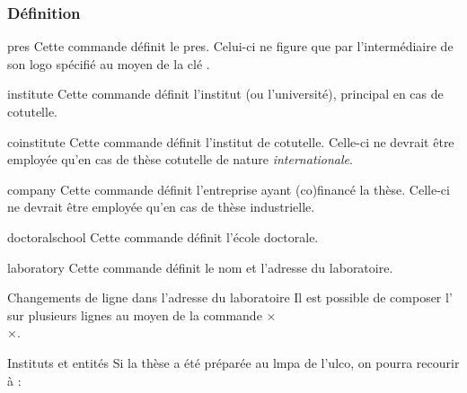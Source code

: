 \subsubsection{Définition}
%
\begin{docCommand}{pres}{}
  Cette commande définit le \gls{pres}. Celui-ci ne figure que
  par l'intermédiaire de son logo spécifié au moyen de la clé .
\end{docCommand}
%
\begin{docCommand}[doc description=\mandatory]{institute}{}
  Cette commande définit l'institut (ou l'université), principal
  en cas de cotutelle.
\end{docCommand}
%
\begin{docCommand}{coinstitute}{}
  Cette commande définit l'institut de cotutelle. Celle-ci ne
  devrait être employée qu'en cas de thèse cotutelle de nature
  \emph{internationale}.
\end{docCommand}
%
\begin{docCommand}{company}{}
  Cette commande définit l'entreprise ayant (co)financé la thèse.
  Celle-ci ne devrait être employée qu'en cas de thèse industrielle.
\end{docCommand}
%
\begin{docCommand}[doc description=\mandatory]{doctoralschool}{}
  Cette commande définit l'école doctorale.
\end{docCommand}
%
\begin{docCommand}[doc description=\mandatory]{laboratory}{}
  Cette commande définit le nom et l'adresse du laboratoire.
\end{docCommand}
%
\begin{dbremark}{Changements de ligne dans l'adresse du laboratoire}{}
  Il est possible de composer l' sur plusieurs
  lignes au moyen de la commande ×\\×.
\end{dbremark}
%
\begin{dbexample}{Instituts et entités}{}
  Si la thèse a été préparée au \gls{lmpa} de l'\gls{ulco}, on
  pourra recourir à :
  \NoAutoSpacing%
\begin{bodycode}
\end{bodycode}
\end{dbexample}
